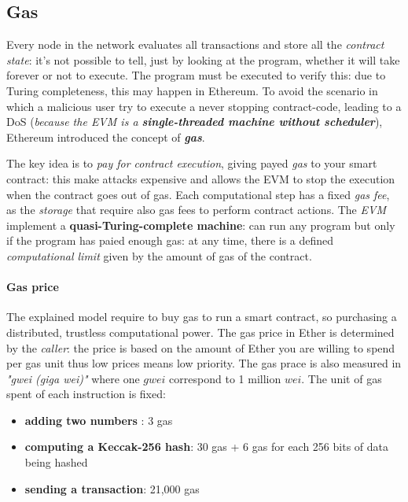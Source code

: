 \documentclass[10pt,a4paper]{report}
\begin{document}
\subsection{Gas}\label{sec:gas}
Every node in the network evaluates all transactions and store all the \textit{contract state}: it's not possible to tell, just by looking at the program, whether it will take forever or not to execute. The program must be executed to verify this: due to Turing completeness, this may happen in Ethereum.
To avoid the scenario in which a malicious user try to execute a never stopping contract-code, leading to a DoS (\textit{because the EVM is a \textbf{single-threaded machine without scheduler}}), Ethereum introduced the concept of \textit{\textbf{gas}}.

The key idea is to \textit{pay for contract execution}, giving payed \textit{gas} to your smart contract: this make attacks expensive and allows the EVM to stop the execution when the contract goes out of gas.
Each computational step has a fixed \textit{gas fee}, as the \textit{storage} that require also gas fees to perform contract actions.
The \textit{EVM} implement a \textbf{quasi-Turing-complete machine}: can run any program but only if the program has paied enough gas: at any time, there is a defined \textit{computational limit} given by the amount of gas of the contract.
\paragraph{Gas price}\label{sec:gas-price}
The explained model require to buy gas to run a smart contract, so purchasing a distributed, trustless computational power.
The gas price in Ether is determined by the \textit{caller}: the price is based on the amount of Ether you are willing to spend per gas unit thus low prices means low priority. The gas prace is also measured in \textit{"gwei (giga wei)"} where one $gwei$ correspond to 1 million $wei$. The unit of gas spent of each instruction is fixed:
\begin{itemize}
	\item 
	\textbf{adding two numbers} : 3 gas
	\item 
	\textbf{computing a Keccak-256 hash}: 30 gas + 6 gas for each 256 bits of data being hashed
	\item 
	\textbf{sending a transaction}: 21,000 gas
\end{itemize}
\end{document}
